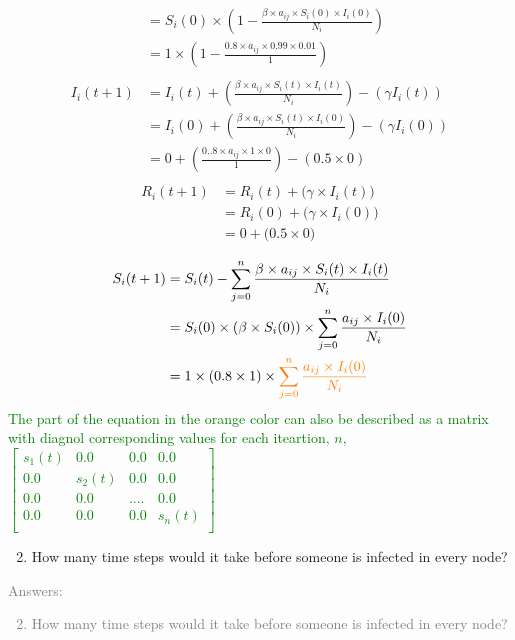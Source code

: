 \documentclass[11pt]{article}
\begin{document}
{\begin{enumerate}
{\begin{align*}
		&=	S_i(0) \times \left( 1 - \frac{\beta \times a_{ij} \times S_i(0) \times I_i(0)}{N_i}\right)\\
		&=	1  \times \left( 1- \frac{0.8 \times a_{ij} \times 0.99 \times 0.01}{1}\right)\\
\end{align*}
\begin{align*}
I_i(t+1) 	&=  I_i(t) + \left(\frac{\beta \times a_{ij} \times S_i(t) \times I_i(t)}{N_i}\right) - (\gamma I_i(t))\\
		&=	I_i(0) + \left(\frac{\beta \times a_{ij} \times S_i(t) \times I_i(0)}{N_i}\right) - (\gamma I_i(0))\\
		&=	0 + \left(\frac{0..8 \times a_{ij} \times 1 \times 0}{1}\right) - (0.5 \times 0)\\
\end{align*}
\begin{align*}
R_i(t+1) 	&=  R_i(t) + \big(\gamma \times I_i(t)\big)\\
		&=  R_i(0) + \big(\gamma \times I_i(0)\big)\\
		&=  0 + \big(0.5 \times 0 \big)\\
\end{align*}
}
\textcolor{green}{
\begin{align*}
S_i(t+1) 	&=  S_i(t) - \sum_{j=0}^{n} \frac{\beta \times a_{ij} \times S_i(t) \times I_i(t)}{N_i}\\
		&=	S_i(0) \times (\beta \times S_i(0)) \times \sum_{j=0}^{n}  \frac{a_{ij} \times I_i(0)}{N_i}\\
		&=	1 \times (0.8 \times 1) \times \textcolor{orange}{\sum_{j=0}^{n}  \frac{a_{ij} \times  I_i(0)}{N_i}}\\
\end{align*}
The part of the equation in the orange color can also be described as a matrix with diagnol corresponding values for each iteartion, $n$, 
$\begin{bmatrix} 
	s_1(t) & 0.0  & 0.0 & 0.0 \\
	0.0 & s_2(t)  & 0.0 & 0.0 \\
	0.0 & 0.0  & . . . .  & 0.0 \\
	0.0 & 0.0  & 0.0 & s_n(t) \\
\end{bmatrix}$\\
}
\end{enumerate}
}

\begin{enumerate}
	\setcounter{enumi}{1}
	\item How many time steps would it take before someone is infected in every node?
\end{enumerate}
\textcolor{gray}{
Answers:
\begin{enumerate}
	\setcounter{enumi}{1}
	\item How many time steps would it take before someone is infected in every node?
\end{enumerate}
}
\end{document}
